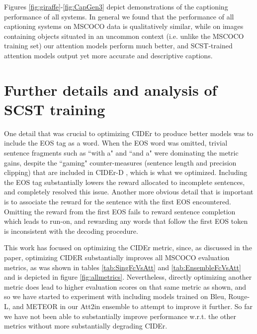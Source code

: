 \documentclass[10pt,twocolumn,letterpaper]{article}
\begin{document}
Figures \ref{fig:giraffe}-\ref{fig:CapGen3} depict demonstrations of the captioning performance of all systems. In general we found that the performance of all captioning systems on MSCOCO data is qualitatively similar, while on images containing objects situated in an uncommon context \cite{Jinchoi_contextmodels} (i.e. unlike the MSCOCO training set) our attention models perform much better, and SCST-trained attention models output yet more accurate and descriptive captions. 

\section{Further details and analysis of SCST training}

One detail that was crucial to optimizing CIDEr to produce better models was to include the EOS tag as a word. When the EOS word was omitted, trivial sentence fragments such as ``with a" and ``and a" were dominating the metric gains, despite the ``gaming" counter-measures (sentence length and precision clipping) that are included in CIDEr-D \cite{CIDEr}, which is what we optimized. Including the EOS tag substantially lowers the reward allocated to incomplete sentences, and completely resolved this issue. Another more obvious detail that is important is to associate the reward for the sentence with the first EOS encountered. Omitting the reward from the first EOS fails to reward sentence completion which leads to run-on, and rewarding any words that follow the first EOS token is inconsistent with the decoding procedure. 

This work has focused on optimizing the CIDEr metric, since, as discussed in the paper, optimizing CIDER substantially improves all MSCOCO evaluation metrics, as was shown in tables \ref{tab:SingFcVsAtt} and \ref{tab:EnsembleFcVsAtt} and is depicted in figure \ref{fig:allmetrics}. Nevertheless, directly optimizing another metric does lead to higher evaluation scores on that same metric as shown, and so we have started to experiment with including models trained on Bleu, Rouge-L, and METEOR in our Att2in ensemble to attempt to improve it further. So far we have not been able to substantially improve performance w.r.t. the other metrics without more substantially degrading CIDEr. 
\end{document}
